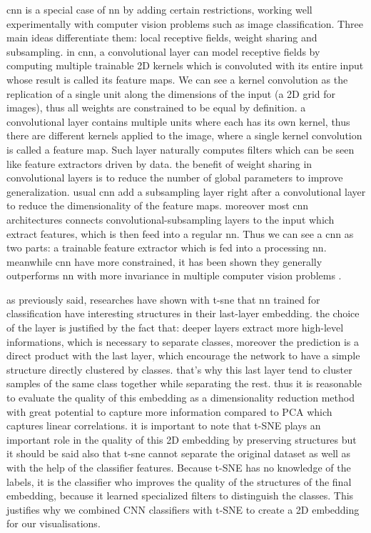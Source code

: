 \documentclass[a4paper,12pt]{report}
\begin{document}
cnn is a special case of nn by adding certain restrictions, working well experimentally with computer vision problems such as image classification.
Three main ideas differentiate them: local receptive fields, weight sharing and subsampling.
in cnn, a convolutional layer can model receptive fields by computing multiple trainable 2D kernels which is convoluted with its entire input whose result is called its feature maps.
We can see a kernel convolution as the replication of a single unit along the dimensions of the input (a 2D grid for images), thus all weights are constrained to be equal by definition.
a convolutional layer contains multiple units where each has its own kernel, thus there are different kernels applied to the image, where a single kernel convolution is called a feature map.
Such layer naturally computes filters which can be seen like feature extractors driven by data.
the benefit of weight sharing in convolutional layers is to reduce the number of global parameters to improve generalization.
usual cnn add a subsampling layer right after a convolutional layer to reduce the dimensionality of the feature maps.
moreover most cnn architectures connects convolutional-subsampling layers to the input which extract features, which is then feed into a regular nn.
Thus we can see a cnn as two parts: a trainable feature extractor which is fed into a processing nn.
meanwhile cnn have more constrained, it has been shown they generally outperforms nn with more invariance in multiple computer vision problems \cite{simard2003best}\cite{mnist_web}\cite{lawrence1997face}\cite{krizhevsky2012imagenet}.

as previously said, researches have shown with t-sne that nn trained for classification have interesting structures in their last-layer embedding.
the choice of the layer is justified by the fact that: deeper layers extract more high-level informations, which is necessary to separate classes, moreover the prediction is a direct product with the last layer, which encourage the network to have a simple structure directly clustered by classes.
that's why this last layer tend to cluster samples of the same class together while separating the rest\cite{donahue2013decaf}\cite{yu2014visualizing}.
thus it is reasonable to evaluate the quality of this embedding as a dimensionality reduction method with great potential to capture more information compared to PCA which captures linear correlations.
it is important to note that t-SNE plays an important role in the quality of this 2D embedding by preserving structures but it should be said also that t-sne cannot separate the original dataset as well as with the help of the classifier features.
Because t-SNE has no knowledge of the labels, it is the classifier who improves the quality of the structures of the final embedding, because it learned specialized filters to distinguish the classes.
This justifies why we combined CNN classifiers with t-SNE to create a 2D embedding for our visualisations.
\end{document}
